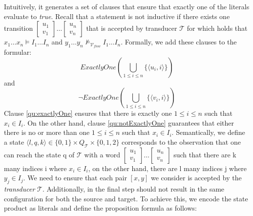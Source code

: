 Intuitively, it generates a set of clauses that ensure that exactly one of the 
literals evaluate to \textit{true}.
Recall that a statement is not inductive if there exists one transition
$[\substack{u_1 \\ v_1}] \dots [\substack{u_n \\ v_n}]$ that is accepted by transducer $\mathcal{T}$
for which holds that $x_1 \dots x_n \models I_1 \dots I_n$ and $y_1 \dots y_n \not\models_{\mathcal{V}_{flow}} I_1 \dots I_n$.
Formally, we add these clauses to the formular:
\begin{equation}\label{qu:exactlyOne}
    ExactlyOne(\bigcup_{1 \leq i \leq n} \{ \langle u_i, i \rangle \})
\end{equation}
and 
\begin{equation}\label{qu:notExactlyOne}
    \lnot ExactlyOne(\bigcup_{1 \leq i \leq n} \{ \langle v_i, i \rangle \})
\end{equation}
Clause \ref{qu:exactlyOne} ensures that there is exactly one
$1 \leq i \leq n$ such that $x_i \in I_i$. 
On the other hand, clause \ref{qu:notExactlyOne} guarantees that either there is no 
or more than one $1 \leq i \leq n$ such that $x_i \in I_i$.
Semantically, we define a state $\langle l,q,k \rangle \in \{0,1\} \times Q_{\mathcal{T}} \times \{0,1,2\}$ 
corresponds to the observation that one
can reach the state q of $\mathcal{T}$ with a word $[\substack{u_1 \\ v_1}] \dots [\substack{u_n \\ v_n}]$
such that there are k many indices i where $x_i \in I_i$, on the other hand,
there are l many indices j where $y_j \in I_j$.
We need to ensure that each pair $[x,y]$ we consider is accepted by the \textit{transducer} $\mathcal{T}$.
Additionally, in the final step should not result in the same configuration for both the source and target. 
To achieve this, we encode the state product as literals and define the proposition formula as follows:

